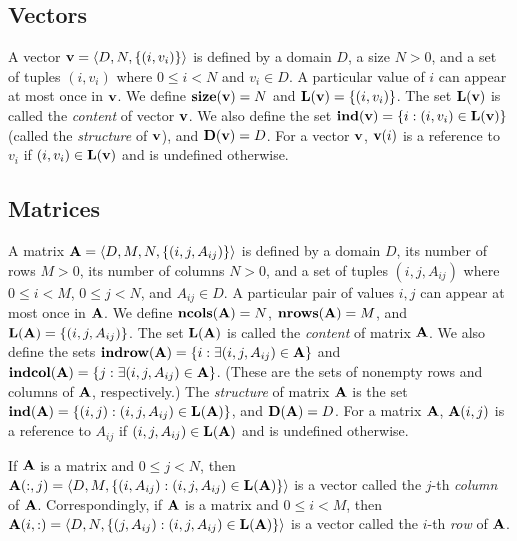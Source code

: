 \subsection{Vectors}
\label{Sec:Vectors}

A vector ${\bf v} = \langle D, N, \{ (i,v_i) \} \rangle$ is defined by
a domain $D$, a size $N>0$, and a set of tuples $(i,v_i)$ where $0 \leq
i < N$ and $v_i \in D$. A particular value of $i$ can appear at
most once in ${\bf v}$. We define $\mathbf{size}({\bf v}) = N$ and
$\mathbf{L}({\bf v}) = \{ (i,v_i) \}$. The set $\mathbf{L}({\bf v})$ is
called the \emph{content} of vector ${\bf v}$. We also define the set
${\bf ind({\bf v})} = \{ i : (i,v_i) \in \mathbf{L}({\bf v}) \}$
(called the \emph{structure} of ${\bf v}$), and $\mathbf{D}({\bf v})
= D$. For a vector ${\bf v}$, ${\bf v}(i)$ is a reference to $v_i$
if $(i,v_i) \in \mathbf{L}({\bf v})$ and is undefined otherwise.

\subsection{Matrices}
\label{Sec:Matrices}

A matrix ${\bf A} = \langle D, M, N, \{ (i,j,A_{ij}) \} \rangle$ is
defined by a domain $D$, its number of rows $M>0$, its number of columns
$N>0$, and a set of tuples $(i,j,A_{ij})$ where $0 \leq i < M$, $0 \leq
j < N$, and $A_{ij} \in D$. A particular pair of values $i,j$ can
appear at most once in ${\bf A}$. We define $\mathbf{ncols}({\bf A})
= N$,  $\mathbf{nrows}({\bf A}) = M$, and $\mathbf{L}({\bf A}) =
\{ (i,j,A_{ij}) \}$.  The set $\mathbf{L}({\bf A})$ is called the
\emph{content} of matrix ${\bf A}$.  We also define the sets
${\bf indrow({\bf A})} = \{ i : \exists (i,j,A_{ij}) \in
{\bf A} \}$ and ${\bf indcol({\bf A})} = \{ j : \exists
(i,j,A_{ij}) \in {\bf A} \}$.  (These are the sets of nonempty
rows and columns of ${\bf A}$, respectively.)  The \emph{structure}
of matrix ${\bf A}$ is the set $\mathbf{ind}({\bf A}) = \{ (i,j) :
(i,j,A_{ij}) \in \mathbf{L}({\bf A}) \}$, and $\mathbf{D}({\bf A}) = D$.
For a matrix ${\bf A}$, ${\bf A}(i,j)$ is a reference to $A_{ij}$
if $(i,j,A_{ij}) \in \mathbf{L}({\bf A})$ and is undefined otherwise.

If ${\bf A}$ is a matrix and $0 \leq j < N$, then ${\bf A}(:,j)
= \langle D, M, \{(i,A_{ij}) : (i,j,A_{ij}) \in \mathbf{L}({\bf A})
\} \rangle$ is a vector called the $j$-th \emph{column}
of ${\bf A}$. Correspondingly, if ${\bf A}$ is a matrix and
$0 \leq i < M$, then ${\bf A}(i,:) = \langle D, N, \{(j,A_{ij}) :
(i,j,A_{ij}) \in \mathbf{L}({\bf A}) \} \rangle$ is a vector called
the $i$-th \emph{row} of ${\bf A}$.

